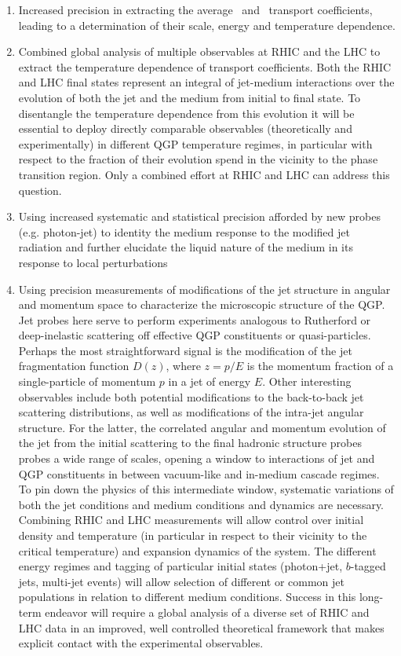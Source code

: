\begin{enumerate}
\item Increased precision in extracting the average \qhat\ and \ehat\ 
transport coefficients, leading to a determination of their scale, energy and temperature dependence.
\item Combined global analysis of multiple observables at RHIC and the LHC 
to extract the temperature dependence of transport coefficients. Both
the RHIC and LHC final states represent an integral of jet-medium
interactions over the evolution of both the jet and the medium from initial
to final state. To disentangle the temperature dependence from
this evolution it will be essential to deploy directly comparable 
observables (theoretically and experimentally) in different 
QGP temperature regimes, in particular with respect to the fraction
of their evolution spend in the vicinity to the phase transition
region. Only a combined effort at RHIC and LHC can address this 
question.
\item Using increased systematic and statistical precision afforded
by new probes (e.g. photon-jet) to identity the medium response to
the modified jet radiation and further elucidate the liquid nature 
of the medium in its response to local perturbations
\item Using precision measurements of modifications of the jet structure 
in angular and momentum space to characterize the microscopic structure 
of the QGP. Jet probes here serve to perform experiments analogous to
Rutherford or deep-inelastic scattering off effective QGP constituents or 
quasi-particles. 
Perhaps the most straightforward signal is the modification of the 
jet fragmentation function $D(z)$, where $z = p/E$ is the momentum fraction 
of a single-particle of momentum $p$ in a jet of energy $E$. 
Other interesting observables include both potential modifications 
to the back-to-back jet scattering distributions, as well as modifications
of the intra-jet angular structure. For the latter, the correlated 
angular and momentum evolution of the jet from the initial scattering 
to the final hadronic structure probes probes a wide
range of scales, opening a window to interactions of jet 
and QGP constituents in between vacuum-like and in-medium cascade 
regimes. To pin down the physics of this intermediate window, 
systematic variations of both the jet conditions 
and medium conditions and dynamics are necessary. Combining RHIC and LHC 
measurements will allow control over initial density and temperature 
(in particular in respect to their vicinity to the critical temperature) 
and expansion dynamics of the system. The different energy regimes and 
tagging of particular initial states (photon+jet, $b$-tagged jets, 
multi-jet events) will allow selection of different or common 
jet populations in relation to different medium conditions. Success in 
this long-term endeavor will require a global analysis of 
a diverse set of RHIC and LHC data in an improved, well controlled
theoretical framework that makes explicit contact with the experimental observables.
\end{enumerate}


